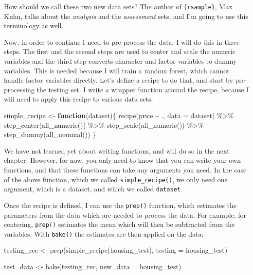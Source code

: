 \documentclass[
]{article}
\newenvironment{Shaded}{\begin{snugshade}}{\end{snugshade}}
\newcommand{\AttributeTok}[1]{\textcolor[rgb]{0.77,0.63,0.00}{#1}}
\newcommand{\ControlFlowTok}[1]{\textcolor[rgb]{0.13,0.29,0.53}{\textbf{#1}}}
\newcommand{\FunctionTok}[1]{\textcolor[rgb]{0.00,0.00,0.00}{#1}}
\newcommand{\NormalTok}[1]{#1}
\newcommand{\OtherTok}[1]{\textcolor[rgb]{0.56,0.35,0.01}{#1}}
\newcommand{\SpecialCharTok}[1]{\textcolor[rgb]{0.00,0.00,0.00}{#1}}
\begin{document}
How should we call these two new data sets? The author of \texttt{\{rsample\}}, Max Kuhn, talks about
the \emph{analysis} and the \emph{assessment} sets, and I'm going to use this terminology as well.

Now, in order to continue I need to pre-process the data. I will do this in three steps.
The first and the second steps are used to center and scale the numeric variables and the third step
converts character and factor variables to dummy variables. This is needed because I will train a
random forest, which cannot handle factor variables directly. Let's define a recipe to do that,
and start by pre-processing the testing set. I write a wrapper function around the recipe,
because I will need to apply this recipe to various data sets:

\begin{Shaded}
\begin{Highlighting}[]
\NormalTok{simple\_recipe }\OtherTok{\textless{}{-}} \ControlFlowTok{function}\NormalTok{(dataset)\{}
    \FunctionTok{recipe}\NormalTok{(price }\SpecialCharTok{\textasciitilde{}}\NormalTok{ ., }\AttributeTok{data =}\NormalTok{ dataset) }\SpecialCharTok{\%\textgreater{}\%}
        \FunctionTok{step\_center}\NormalTok{(}\FunctionTok{all\_numeric}\NormalTok{()) }\SpecialCharTok{\%\textgreater{}\%}
        \FunctionTok{step\_scale}\NormalTok{(}\FunctionTok{all\_numeric}\NormalTok{()) }\SpecialCharTok{\%\textgreater{}\%}
        \FunctionTok{step\_dummy}\NormalTok{(}\FunctionTok{all\_nominal}\NormalTok{())}
\NormalTok{\}}
\end{Highlighting}
\end{Shaded}

We have not learned yet about writing functions, and will do so in the next chapter. However, for
now, you only need to know that you can write your own functions, and that these functions can
take any arguments you need. In the case of the above function, which we called \texttt{simple\_recipe()},
we only need one argument, which is a dataset, and which we called \texttt{dataset}.

Once the recipe is defined, I can use the \texttt{prep()} function, which estimates the parameters from
the data which are needed to process the data. For example, for centering, \texttt{prep()} estimates
the mean which will then be subtracted from the variables. With \texttt{bake()} the estimates are then
applied on the data:

\begin{Shaded}
\begin{Highlighting}[]
\NormalTok{testing\_rec }\OtherTok{\textless{}{-}} \FunctionTok{prep}\NormalTok{(}\FunctionTok{simple\_recipe}\NormalTok{(housing\_test), }\AttributeTok{testing =}\NormalTok{ housing\_test)}

\NormalTok{test\_data }\OtherTok{\textless{}{-}} \FunctionTok{bake}\NormalTok{(testing\_rec, }\AttributeTok{new\_data =}\NormalTok{ housing\_test)}
\end{Highlighting}
\end{Shaded}
\end{document}
